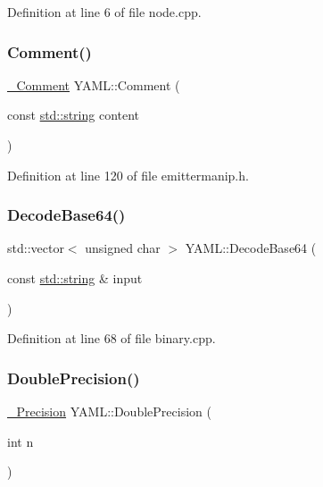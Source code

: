 Definition at line 6 of file node.\+cpp.

\mbox{\label{namespace_y_a_m_l_a17871d5ffb83e432d5d502cd8ce1a849}} 
\subsubsection{\texorpdfstring{Comment()}{Comment()}}
{\footnotesize\ttfamily \mbox{\hyperlink{struct_y_a_m_l_1_1___comment}{\+\_\+\+Comment}} Y\+A\+M\+L\+::\+Comment (\begin{DoxyParamCaption}\item[{const \mbox{\hyperlink{glad_8h_ac83513893df92266f79a515488701770}{std\+::string}}}]{content }\end{DoxyParamCaption})\hspace{0.3cm}{\ttfamily [inline]}}



Definition at line 120 of file emittermanip.\+h.

\mbox{\label{namespace_y_a_m_l_af47440bbb5fd6e209f0284c0693878c6}} 
\subsubsection{\texorpdfstring{DecodeBase64()}{DecodeBase64()}}
{\footnotesize\ttfamily std\+::vector$<$ unsigned char $>$ Y\+A\+M\+L\+::\+Decode\+Base64 (\begin{DoxyParamCaption}\item[{const \mbox{\hyperlink{glad_8h_ac83513893df92266f79a515488701770}{std\+::string}} \&}]{input }\end{DoxyParamCaption})}



Definition at line 68 of file binary.\+cpp.

\mbox{\label{namespace_y_a_m_l_a5bfff5856ad42516e6ac781009239eef}} 
\subsubsection{\texorpdfstring{DoublePrecision()}{DoublePrecision()}}
{\footnotesize\ttfamily \mbox{\hyperlink{struct_y_a_m_l_1_1___precision}{\+\_\+\+Precision}} Y\+A\+M\+L\+::\+Double\+Precision (\begin{DoxyParamCaption}\item[{int}]{n }\end{DoxyParamCaption})\hspace{0.3cm}{\ttfamily [inline]}}



